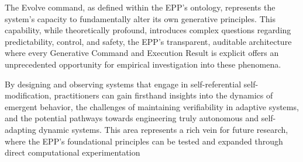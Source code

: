 The Evolve command, as defined within the EPP's ontology, represents the system's capacity to  fundamentally alter its own generative principles. This capability, while theoretically profound, introduces complex questions regarding predictability, control, and safety, the EPP's transparent, auditable  architecture where every Generative Command and Execution Result is explicit offers an unprecedented opportunity for empirical investigation into these phenomena.

By designing and observing systems that engage in self-referential self-modification, practitioners can gain firsthand insights into the dynamics of emergent behavior, the challenges of maintaining verifiability in adaptive systems, and the potential pathways towards engineering truly autonomous and self-adapting dynamic systems. This area represents a rich vein for future research, where the EPP's foundational principles can be tested and expanded through direct computational experimentation

\newpage